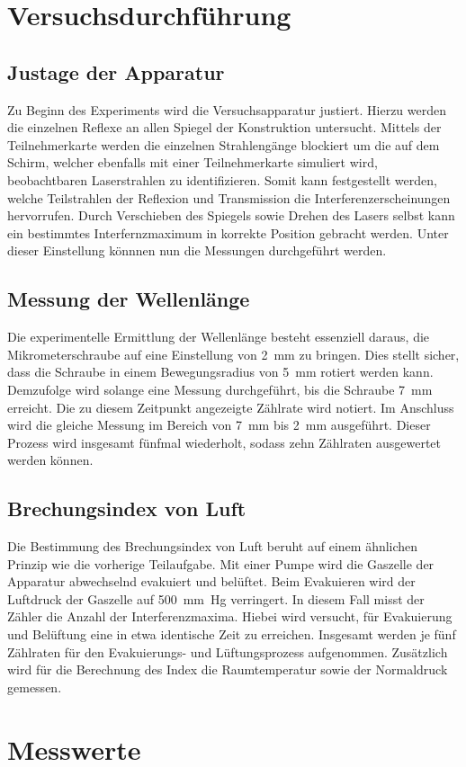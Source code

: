 \section{Versuchsdurchführung}
\label{sec:Versuchsdurchfuehrung}

\subsection{Justage der Apparatur}

Zu Beginn des Experiments wird die Versuchsapparatur justiert. Hierzu werden die einzelnen Reflexe an allen Spiegel der Konstruktion 
untersucht. Mittels der Teilnehmerkarte werden die einzelnen Strahlengänge blockiert um die auf dem Schirm, welcher ebenfalls mit einer 
Teilnehmerkarte simuliert wird, beobachtbaren Laserstrahlen zu identifizieren. Somit kann festgestellt werden, welche Teilstrahlen der 
Reflexion und Transmission die Interferenzerscheinungen hervorrufen. Durch Verschieben des Spiegels  sowie Drehen des Lasers
selbst kann ein bestimmtes Interfernzmaximum in korrekte Position gebracht werden. Unter dieser Einstellung könnnen nun die Messungen 
durchgeführt werden.

\subsection{Messung der Wellenlänge}

Die experimentelle Ermittlung der Wellenlänge besteht essenziell daraus, die Mikrometerschraube auf eine Einstellung von \qty{2}{\milli\meter}
zu bringen. Dies stellt sicher, dass die Schraube in einem Bewegungsradius von \qty{5}{\milli\meter} rotiert werden kann. Demzufolge wird 
solange eine Messung durchgeführt, bis die Schraube \qty{7}{\milli\meter} erreicht. Die zu diesem Zeitpunkt angezeigte Zählrate wird notiert.
Im Anschluss wird die gleiche Messung im Bereich von \qty{7}{\milli\meter} bis \qty{2}{\milli\meter} ausgeführt. Dieser Prozess wird insgesamt 
fünfmal wiederholt, sodass zehn Zählraten ausgewertet werden können.

\subsection{Brechungsindex von Luft}

Die Bestimmung des Brechungsindex von Luft beruht auf einem ähnlichen Prinzip wie die vorherige Teilaufgabe. Mit einer Pumpe wird die Gaszelle 
der Apparatur abwechselnd evakuiert und belüftet. Beim Evakuieren wird der Luftdruck der Gaszelle auf \qty{500}{\milli \meter Hg} verringert.
In diesem Fall misst der Zähler die Anzahl der Interferenzmaxima. Hiebei wird versucht, 
für Evakuierung und Belüftung eine in etwa identische Zeit zu erreichen. Insgesamt werden je fünf Zählraten für den Evakuierungs- und 
Lüftungsprozess aufgenommen. Zusätzlich wird für die Berechnung des Index die Raumtemperatur sowie der Normaldruck gemessen. 

\section{Messwerte}



